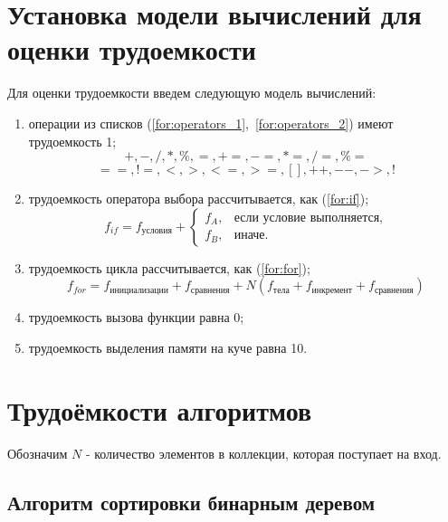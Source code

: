 \section{Установка модели вычислений для оценки трудоемкости}

Для оценки трудоемкости введем следующую модель вычислений:
\begin{enumerate}
    \item операции из списков (\ref{for:operators_1},~\ref{for:operators_2}) имеют трудоемкость 1;
    \begin{equation}
        \label{for:operators_1}
        +, -, /, *, \%, =, +=, -=, *=, /=, \%=
    \end{equation}
    \begin{equation}
        \label{for:operators_2}
        ==, !=, <, >, <=, >=, [], ++, {-}-, ->, !
    \end{equation}
    \item трудоемкость оператора выбора  рассчитывается, как (\ref{for:if});
    \begin{equation}
        \label{for:if}
        f_{if} = f_{\text{условия}} +
        \begin{cases}
            f_A, & \text{если условие выполняется,}\\
            f_B, & \text{иначе.}
        \end{cases}
    \end{equation}
    \item трудоемкость цикла рассчитывается, как (\ref{for:for});
    \begin{equation}
        \label{for:for}
        f_{for} = f_{\text{инициализации}} + f_{\text{сравнения}} + N(f_{\text{тела}} + f_{\text{инкремент}} + f_{\text{сравнения}})
    \end{equation}
    \item трудоемкость вызова функции равна 0;
    \item трудоемкость выделения памяти на куче равна 10.
\end{enumerate}

\section{Трудоёмкости алгоритмов}

Обозначим $N$ - количество элементов в коллекции, которая поступает на вход.

\subsection{Алгоритм сортировки бинарным деревом}

